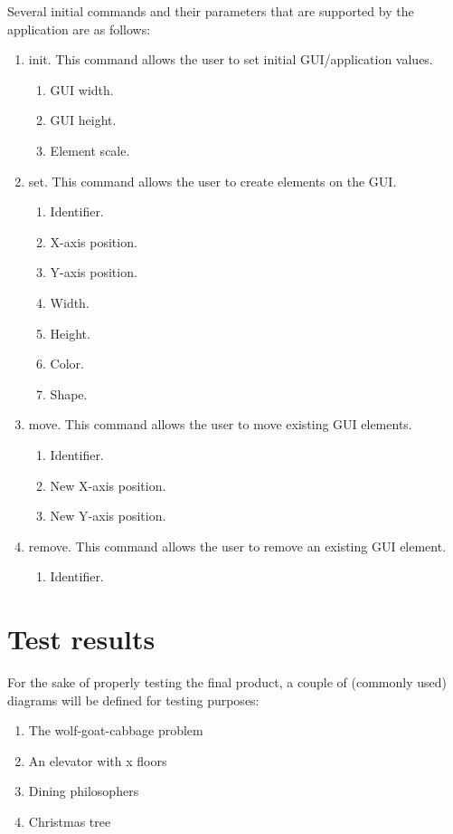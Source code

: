 \documentclass[11pt,a4paper,twocolumn]{article}
\begin{document}
Several initial commands and their parameters that are supported by the application are as follows:
\begin{enumerate}
	\item init. This command allows the user to set initial GUI/application values.
		\begin{enumerate}
			\item GUI width.
			\item GUI height.
			\item Element scale.
		\end{enumerate}
	\item set. This command allows the user to create elements on the GUI.
		\begin{enumerate}
			\item Identifier.
			\item X-axis position.
			\item Y-axis position.
			\item Width.
			\item Height.
			\item Color.
			\item Shape.
		\end{enumerate}
	\item move. This command allows the user to move existing GUI elements.
		\begin{enumerate}
			\item Identifier.
			\item New X-axis position.
			\item New Y-axis position.
		\end{enumerate}
	\item remove. This command allows the user to remove an existing GUI element.
		\begin{enumerate}
			\item Identifier.
		\end{enumerate}
\end{enumerate}


\section{Test results}

For the sake of properly testing the final product, a couple of (commonly used) diagrams will be defined for testing purposes:

\begin{enumerate}
	\item The wolf-goat-cabbage problem
	\item An elevator with x floors
	\item Dining philosophers
	\item Christmas tree
\end{enumerate}
\end{document}
